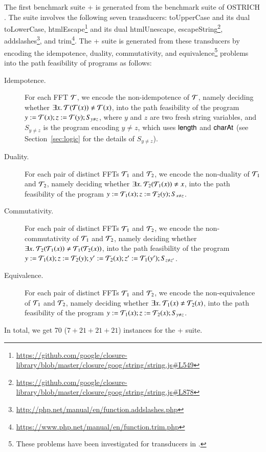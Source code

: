 The first benchmark suite {\transducerbench+} is generated from the {\transducerbench} benchmark suite of OSTRICH \cite{CHL+19}.  The {\transducerbench} suite involves the following seven transducers: toUpperCase and its dual toLowerCase, htmlEscape\footnote{\url{https://github.com/google/closure-library/blob/master/closure/goog/string/string.js#L549}} and its dual htmlUnescape, escapeString\footnote{\url{https://github.com/google/closure-library/blob/master/closure/goog/string/string.js#L878}}, addslashes\footnote{\url{http://php.net/manual/en/function.addslashes.php}}, and trim\footnote{\url{https://www.php.net/manual/en/function.trim.php}}. The {\transducerbench+} suite is generated from these transducers by encoding the idempotence, duality, commutativity, and equivalence\footnote{These problems have been investigated for transducers in \cite{BEK}.} problems into the path feasibility of {\slint} programs as follows:
\begin{description}
\item[Idempotence.] For each FFT $\mathcal{T}$,  we encode the non-idempotence of $\mathcal{T}$, namely deciding whether $\exists x.\ \mathcal{T}(\mathcal{T}(x)) \neq \mathcal{T}(x)$, into the path feasibility of the {\slint} program $y:=\mathcal{T}(x); z:=\mathcal{T}(y); S_{y \neq z}$, where $y$ and $z$ are two fresh string variables, and $S_{y \neq z}$ is the {\slint} program encoding $y \neq z$, which uses $\mathsf{length}$ and $\mathsf{charAt}$ (see Section~\ref{sec:logic} for the details of $S_{y \neq z}$).
%
\item[Duality.] For each pair of distinct FFTs $\mathcal{T}_1$ and $\mathcal{T}_2$, we encode the non-duality of $\mathcal{T}_1$ and $\mathcal{T}_2$, namely deciding whether $\exists x.\ \mathcal{T}_2(\mathcal{T}_1(x)) \neq x$, into the path feasibility of the {\slint} program $y:=\mathcal{T}_1(x); z: = \mathcal{T}_2(y); S_{x \neq z}$.
%
\item[Commutativity.] For each pair of distinct FFTs $\mathcal{T}_1$ and $\mathcal{T}_2$, we encode the non-commutativity of $\mathcal{T}_1$ and $\mathcal{T}_2$, namely deciding whether $\exists x.\ \mathcal{T}_2(\mathcal{T}_1(x)) \neq \mathcal{T}_1(\mathcal{T}_2(x))$, into the path feasibility of the {\slint} program $y:=\mathcal{T}_1(x); z: = \mathcal{T}_2(y); y':= \mathcal{T}_2(x); z': = \mathcal{T}_1(y'); S_{z \neq z'}$.
%
\item[Equivalence.] For each pair of distinct FFTs $\mathcal{T}_1$ and $\mathcal{T}_2$, we encode the non-equivalence of $\mathcal{T}_1$ and $\mathcal{T}_2$, namely deciding whether $\exists x.\ \mathcal{T}_1(x) \neq \mathcal{T}_2(x)$, into the path feasibility of the {\slint} program $y:=\mathcal{T}_1(x); z: = \mathcal{T}_2(x); S_{y \neq z}$.
%
\end{description}
In total, we get 70 ($7+21+21+21$)  instances for the {\transducerbench+} suite. 

